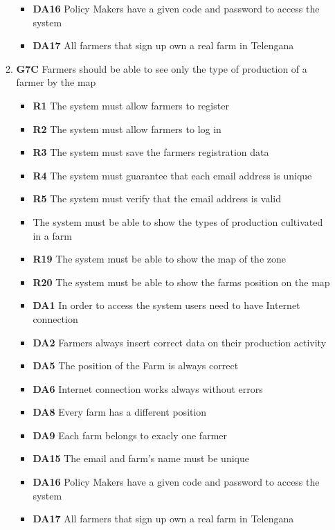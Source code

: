 \begin{itemize}
\begin{enumerate}
\begin{itemize}
            \item \textbf{DA16} Policy Makers have a given code and password to access the system
            \item \textbf{DA17} All farmers that sign up own a real farm in Telengana
        \end{itemize}    
        \item \textbf{G7C} Farmers should be able to see only the type of production of a farmer by the map
        \begin{itemize}
            \renewcommand\labelitemi{--}
            \item \textbf{R1} The system must allow farmers to register
            \item \textbf{R2} The system must allow farmers to log in
            \item \textbf{R3} The system must save the farmers registration data
            \item \textbf{R4} The system must guarantee that each email address is unique
            \item \textbf{R5} The system must verify that the email address is valid
            \item \textbf{} The system must be able to show the types of production cultivated in a farm
            \item \textbf{R19} The system must be able to show the map of the zone
            \item \textbf{R20} The system must be able to show the farms position on the map
            \item \textbf{DA1} In order to access the system users need to have Internet connection
            \item \textbf{DA2} Farmers always insert correct data on their production activity
            \item \textbf{DA5} The position of the Farm is always correct
            \item \textbf{DA6} Internet connection works always without errors
            \item \textbf{DA8} Every farm has a different position
            \item \textbf{DA9} Each farm belongs to exacly one farmer
            \item \textbf{DA15} The email and farm's name must be unique
            \item \textbf{DA16} Policy Makers have a given code and password to access the system
            \item \textbf{DA17} All farmers that sign up own a real farm in Telengana
            
        \end{itemize}
    \end{enumerate}
\end{itemize}
    
